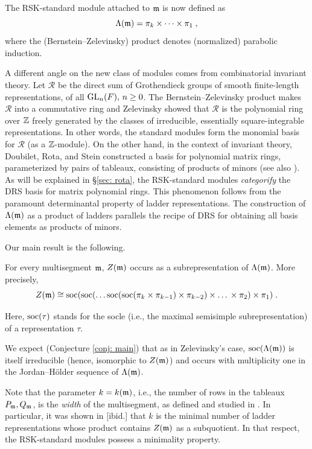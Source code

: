 \documentclass{ert-l} %
\begin{document}
The RSK-standard module attached to $\mathfrak{m}$ is now defined as
\[
\Lambda(\mathfrak{m}) = \pi_k\times\cdots \times \pi_1\;,
\]
where the (Bernstein--Zelevinsky) product denotes (normalized) parabolic induction.


A different angle on the new class of modules comes from combinatorial invariant theory.
Let $\mathcal{R}$ be the direct sum of Grothendieck groups of smooth finite-length representations, of all $\operatorname{GL}_n(F),\,n\geq0$.
The Bernstein--Zelevinsky product makes $\mathcal{R}$ into a commutative ring and Zelevinsky showed that $\mathcal{R}$ is the polynomial ring over $\mathbb{Z}$ freely generated by the classes
of irreducible, essentially square-integrable representations.
In other words, the standard modules form the monomial basis for $\mathcal{R}$ (as a $\mathbb{Z}$-module).
On the other hand, in the context of invariant theory, Doubilet, Rota, and Stein constructed a basis for polynomial matrix rings,
parameterized by pairs of tableaux, consisting of products of minors \cites{MR0498650} (see also \cites{MR0485944, 1605.06696}).
As will be explained in \S\ref{sec: rota}, the RSK-standard modules \textit{categorify} the DRS basis for matrix polynomial rings.
This phenomenon follows from the paramount determinantal property \cite{MR3163355} of ladder representations.
The construction of $\Lambda(\mathfrak{m})$ as a product of ladders parallels the recipe of DRS for obtaining all basis elements as products of minors.


Our main result is the following.
\begin{theorem}\label{thm: intro}
For every multisegment $\mathfrak{m}$, $Z(\mathfrak{m})$ occurs as a subrepresentation of $\Lambda(\mathfrak{m})$. More precisely,
\[
Z(\mathfrak{m}) \cong \operatorname{soc}(\operatorname{soc}(\dots\operatorname{soc}(\operatorname{soc}(\pi_k\times\pi_{k-1})\times\pi_{k-2})\times \dots\, \times\pi_2)\times \pi_1)\;.
\]
\end{theorem}
Here, $\operatorname{soc}(\tau)$ stands for the socle (i.e., the maximal semisimple subrepresentation) of a representation $\tau$.

We expect (Conjecture \ref{conj: main}) that as in Zelevinsky's case, $\operatorname{soc}(\Lambda(\mathfrak{m}))$ is itself irreducible (hence, isomorphic to $Z(\mathfrak{m})$)
and occurs with multiplicity one in the Jordan--H\"older sequence of $\Lambda(\mathfrak{m})$.

Note that the parameter $k= k(\mathfrak{m})$, i.e., the number of rows in the tableaux $P_{\mathfrak{m}},Q_{\mathfrak{m}}$, is the \textit{width} of the multisegment, as defined and studied in \cite{10.1093/imrn/rnz006}.
In particular, it was shown in [ibid.] that $k$ is the minimal number of ladder representations whose product contains $Z(\mathfrak{m})$ as a subquotient.
In that respect, the RSK-standard modules possess a minimality property.
\end{document}
